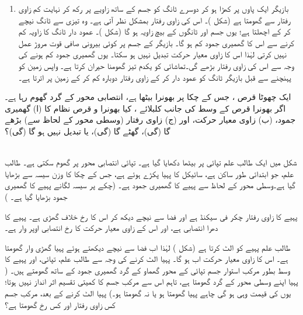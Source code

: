 \begin{enumerate}[1.]
\item
 بازیگر ایک پاوں  پر کھڑا ہو کر دوسرے  ٹانگ کو  جسم کے ساتھ  زاویے پر رکھ کر  نہایت  کم زاوی رفتار  سے گھومتا ہے (شکل )۔ اس کی زاوی رفتار بمشکل نظر آتی ہے۔ وہ تیزی سے ٹانگ نیچے کر کے اچھلتا ہے؛ یوں   جسم اور ٹانگوں کے بیچ زاویہ   ہو گا (شکل )۔ عمود دار ٹانگ کا زاویہ کم کرنے سے اس کا گھمیری جمود کم ہو گا۔ بازیگر کے جسم پر کوئی بیرونی صافی قوت مروڑ عمل نہیں کرتی لہٰذا اس کا زاوی معیار حرکت تبدیل نہیں ہو سکتا۔ یوں گھمیری جمود کم ہونے  کی وجہ سے اس کی زاوی رفتار بڑھے گی۔تماشائی کو یکدم تیز گھومنا  حیران کرتا ہے۔ واپس زمین کو پہنچنے سے  قبل  بازیگر ٹانگ  کو عمود دار کر کے زاوی رفتار  دوبارہ کم کر کے زمین پر   اترتا ہے۔
 \end{enumerate}
 
 ایک چھوٹا قرص ، جس  کے  چکا پر    بھونرا  بیٹھا ہے، انتصابی محور کے گرد گھوم رہا ہے۔ اگر بھونرا  قرص کے وسط کی جانب  کلبلائے ،   کیا بھونرا و قرص نظام کا  (ا)    گھمیری جمود، (ب) زاوی معیار حرکت، اور (ج) زاوی رفتار   (وسطی محور کے لحاظ سے)  بڑھے گا (گی)، گھٹے گا (گی)، یا تبدیل نہیں ہو گا (گی)؟
 
 \\
 
 شکل  میں  ایک طالب علم تپائی پر بیٹھا  دکھایا گیا ہے۔ تپائی انتصابی محور پر گھوم سکتی ہے۔ طالب علم، جو ابتدائی طور ساکن ہے، سائیکل کا پہیا  پکڑے ہوئے ہے، جس کے چکا  کا وزن  سیسہ  سے بڑھایا گیا ہے۔وسطی محور کے لحاظ سے پہیے کا گھمیری جمود  ہے۔ (چکے پر سیسہ لگانے پہیے کا گھمیری جمود بڑھایا گیا ہے۔ )
 
 پہیے کا زاوی رفتار  چکر فی سیکنڈ ہے اور   فضا سے نیچے دیکھ کر اس کا رخ خلاف گھڑی ہے۔ پہیے کا دھرا انتصابی ہے، اور اس کے زاوی معیار حرکت  کا رخ انتصابی  اوپر  وار ہے۔
 
 طالب علم پہیے کو الٹ کرتا ہے (شکل ) لہٰذا اب فضا سے نیچے دیکھتے ہوئے پہیا گھڑی وار گھومتا ہے۔ اس کا زاوی معیار حرکت
  اب  ہو گا۔ پہیا الٹ کرنے کی وجہ سے طالب علم، تپائی، اور  پہیے  کا وسط بطور   مرکب استوار جسم  تپائی کے محور گھماو کے گرد گھمیری جمود  کے ساتھ گھومتے ہیں۔ (  پہیا  اپنے وسطی محور کے گرد گھومتا ہے،   تاہم اس سے مرکب جسم کا کمیتی تقسیم اثر انداز نہیں ہوتا؛ یوں  کی قیمت وہی ہو گی چاہے پہیا گھومتا ہو یا نہ گھومتا ہو۔) پہیا الٹ کرنے کے بعد، مرکب جسم کس زاوی رفتار  اور  کس رخ گھومتا ہے؟
  
